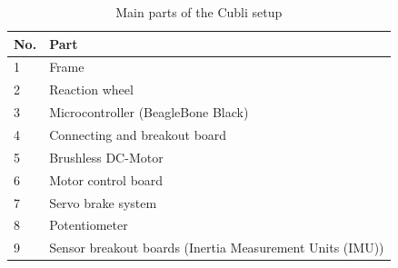 \begin{table}[H]
	\begin{tabular}{|l|p{6.7cm}|}
		\hline %
		\textbf{No.} &\textbf{Part} 			\\
		\hline %
		1            & Frame           			\\
		\hline %
		2            & Reaction wheel      		\\
		\hline %
		3            & Microcontroller (BeagleBone Black)  \\
		\hline %
		4            & Connecting and breakout board 			\\
		\hline %
		5            & Brushless DC-Motor       			\\
		\hline %
		6            & Motor control board   	\\
		\hline %
		7            & Servo brake system     	\\
		\hline %
		8            & Potentiometer 		    	\\
		\hline %
		9            & Sensor breakout boards (Inertia Measurement Units (IMU)) 		    	\\
		\hline %
	\end{tabular}
	\caption{Main parts of the Cubli setup}
	\label{TableAAUCubliComponent}
\end{table}



